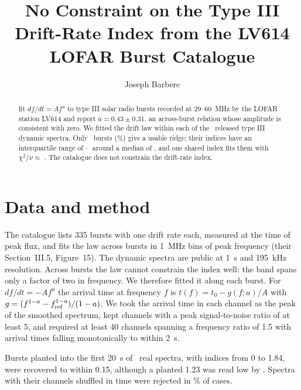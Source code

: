 \documentclass[RNAAS]{aastex631}
\begin{document}
\title{No Constraint on the Type III Drift-Rate Index from the LV614 LOFAR Burst Catalogue}

\author[0009-0008-3289-4447]{Joseph Barbere}

\begin{abstract}
\citet{steinbergs2026} fit $df/dt=Af^{a}$ to type III solar radio bursts recorded at 29--60~MHz by
the LOFAR station LV614 and report $a=0.43\pm0.31$, an across-burst relation whose amplitude is
consistent with zero. We fitted the drift law within each of the \lvdriftRealNBursts\ released
type III dynamic spectra. Only \lvdriftRealNPass\ bursts (\lvdriftRealFracPass\%) give a usable
ridge; their indices have an interquartile range of \lvdriftRealAqLo--\lvdriftRealAqHi\ around a
median of \lvdriftRealMedA, and one shared index fits them with $\chi^2/\nu\approx$
\lvdriftRealJointChi. The catalogue does not constrain the drift-rate index.
\end{abstract}

\section{Data and method}
\label{sec:method}
The catalogue \citep{steinbergs2026} lists 335 bursts with one drift rate each, measured at the time
of peak flux, and fits the law across bursts in 1~MHz bins of peak frequency (their Section~III.5,
Figure~15). The dynamic spectra are public \citep{lv614data} at 1~s and 195~kHz resolution. Across
bursts the law cannot constrain the index well: the band spans only a factor of two in frequency.
We therefore fitted it along each burst. For $df/dt=-Af^{a}$ the arrival time at frequency $f$ is
$t(f)=t_0-g(f;a)/A$ with $g=(f^{1-a}-f_{\rm ref}^{1-a})/(1-a)$. We took the arrival time in each
channel as the peak of the smoothed spectrum, kept channels with a peak signal-to-noise ratio of at
least 5, and required at least 40 channels spanning a frequency ratio of 1.5 with arrival times
falling monotonically to within 2~s.

Bursts planted into the first 20~s of \lvdriftRealPoneWin\ real spectra, with indices from 0 to
1.84, were recovered to within 0.15, although a planted 1.23 was read low by \lvdriftSynPoneBias.
Spectra with their channels shuffled in time were rejected in \lvdriftRealNoneRej\% of cases.
\end{document}
